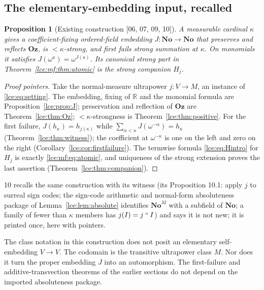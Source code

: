\documentclass[11pt,letterpaper]{article}
\numberwithin{equation}{section}
\newtheorem{proposition}[theorem]{Proposition}
\theoremstyle{definition}
\theoremstyle{remark}
\newcommand{\No}{\mathbf{No}}
\newcommand{\Oz}{\mathbf{Oz}}
\newcommand{\R}{\mathbb R}
\newcommand{\imset}[2]{#1\mathbin{``}#2}
\newcommand{\thref}[1]{Theorem~\ref{#1}}
\newcommand{\prref}[1]{Proposition~\ref{#1}}
\newcommand{\leref}[1]{Lemma~\ref{#1}}
\newcommand{\src}[1]{\textup{\textsf{\small[#1]}}}%
\begin{document}
\subsection{The elementary-embedding input, recalled}
\begin{proposition}[Existing construction \src{06, 07, 09, 10}]\label{lce:mf:prop:J}
A measurable cardinal $\kappa$ gives a coefficient-fixing ordered-field
embedding $J:\No\to\No$ that preserves and reflects $\Oz$, is
${<}\kappa$-strong, and first fails strong summation at $\kappa$. On
monomials it satisfies $J(\omega^a)=\omega^{J(a)}$. Its canonical strong
part in \thref{lce:mf:thm:atomic} is the strong companion $H_j$.
\end{proposition}
\begin{proof}[Proof pointers]
Take the normal-measure ultrapower $j:V\to M$, an instance of
\eqref{lce:eq:setting}. The embedding, fixing of $\R$ and the monomial
formula are \prref{lce:prop:J}; preservation and reflection of $\Oz$ are
\thref{lce:thm:Oz}; ${<}\kappa$-strongness is \thref{lce:thm:positive}.
For the first failure, $J(h_\kappa)=h_{j(\kappa)}$ while
$\sum_{\alpha<\kappa}J(\omega^{-\alpha})=h_\kappa$
(\thref{lce:thm:witness}); the coefficient at $\omega^{-\kappa}$ is one on
the left and zero on the right (Corollary~\ref{lce:cor:firstfailure}). The
termwise formula \eqref{lce:eq:Hintro} for $H_j$ is exactly
\eqref{lce:mf:eq:atomic}, and uniqueness of the strong extension proves the
last assertion (\thref{lce:thm:companion}).
\end{proof}
10 recalls the same construction with its witness (its Proposition 10.1:
apply $j$ to surreal sign codes; the sign-code arithmetic and normal-form
absoluteness package of \leref{lce:lem:absolute} identifies $\No^M$ with a
subfield of $\No$; a family of fewer than $\kappa$ members has
$j(I)=\imset jI$) and says it is not new; it is printed once, here with
pointers.

The class notation in this construction does not posit an elementary
self-embedding $V\to V$. The codomain is the transitive ultrapower class
$M$. Nor does it turn the proper embedding $J$ into an automorphism. The
first-failure and additive-transvection theorems of the earlier sections do
not depend on the imported absoluteness package.
\end{document}

